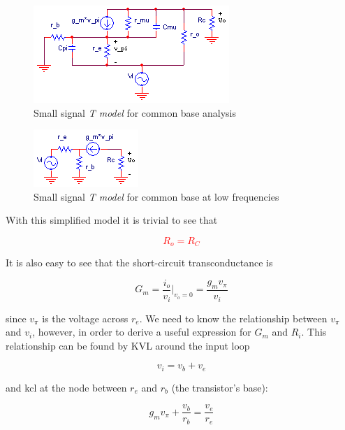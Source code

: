\begin{figure}[h]
	\centering
		\includegraphics{schematics/ss_commonbase_T_model.PNG}
	\caption{Small signal \textsl{T model} for common base analysis}
	\label{fig:ss_commonbase_T_model}
\end{figure}

\begin{figure}[h]
	\centering
		\includegraphics{schematics/ss_commonbase_T_model_approx.PNG}
	\caption{Small signal \textsl{T model} for common base at low frequencies}
	\label{fig:ss_commonbase_T_model_approx}
\end{figure}

With this simplified model it is trivial to see that

\textcolor{red}{
\begin{equation}
R_{o} = R_{C}
\label{eq:common_base_Ro}
\end{equation}
}

It is also easy to see that the short-circuit transconductance is

\begin{equation}
G_{m} = \frac{i_{o}}{v_{i}}|_{v_{o}=0} = \frac{g_{m}v_{\pi}}{v_{i}}
\label{eq:commonbase_Gm_initial}
\end{equation}

since $v_{\pi}$ is the voltage across $r_{e}$. We need to know the relationship between $v_{\pi}$ and $v_{i}$, however, in order to derive a useful expression for $G_{m}$ and $R_{i}$. This relationship can be found by KVL around the input loop

\begin{equation}
v_{i} = v_{b} + v_{e}
\end{equation}

and \ac{kcl} at the node between $r_{e}$ and $r_{b}$ (the transistor's base):

\begin{equation}
g_{m}v_{\pi} + \frac{v_{b}}{r_{b}} = \frac{v_{e}}{r_{e}}
\label{eq:commonbase_KCL_base}
\end{equation}

